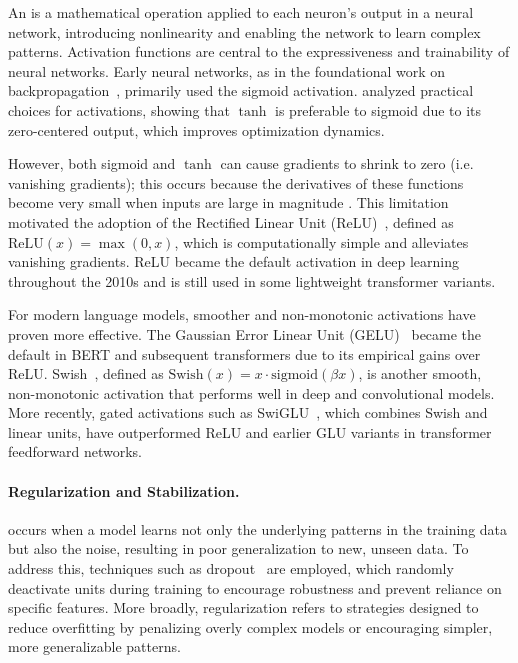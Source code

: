 An  is a mathematical operation applied to each neuron's output in a neural network, introducing nonlinearity and enabling the network to learn complex patterns. Activation functions are central to the expressiveness and trainability of neural networks. Early neural networks, as in the foundational work on backpropagation~\citep{rumelhart1986learning}, primarily used the sigmoid activation. \citet{lecun1998efficient} analyzed practical choices for activations, showing that $\tanh$ is preferable to sigmoid due to its zero-centered output, which improves optimization dynamics.

However, both sigmoid and $\tanh$ can cause gradients to shrink to zero (i.e. vanishing gradients); this occurs because the derivatives of these functions become very small when inputs are large in magnitude \citet{glorot2010understanding}. This limitation motivated the adoption of the Rectified Linear Unit (ReLU)~\citep{nair2010rectified}, defined as $\mathrm{ReLU}(x) = \max(0, x)$, which is computationally simple and alleviates vanishing gradients. ReLU became the default activation in deep learning throughout the 2010s and is still used in some lightweight transformer variants. %

For modern language models, smoother and non-monotonic activations have proven more effective. The Gaussian Error Linear Unit (GELU)~\citep{hendrycks2016gaussian} became the default in BERT and subsequent transformers due to its empirical gains over ReLU. Swish~\citep{ramachandran2017searching}, defined as $\mathrm{Swish}(x) = x \cdot \mathrm{sigmoid}(\beta x)$, is another smooth, non-monotonic activation that performs well in deep and convolutional models. More recently, gated activations such as SwiGLU~\citep{shazeer2020glu}, which combines Swish and linear units, have outperformed ReLU and earlier GLU variants in transformer feedforward networks.

\paragraph{Regularization and Stabilization.}  occurs when a model learns not only the underlying patterns in the training data but also the noise, resulting in poor generalization to new, unseen data. To address this,  techniques such as dropout~\citep{srivastava2014dropout} are employed, which randomly deactivate units during training to encourage robustness and prevent reliance on specific features. More broadly, regularization refers to strategies designed to reduce overfitting by penalizing overly complex models or encouraging simpler, more generalizable patterns.

